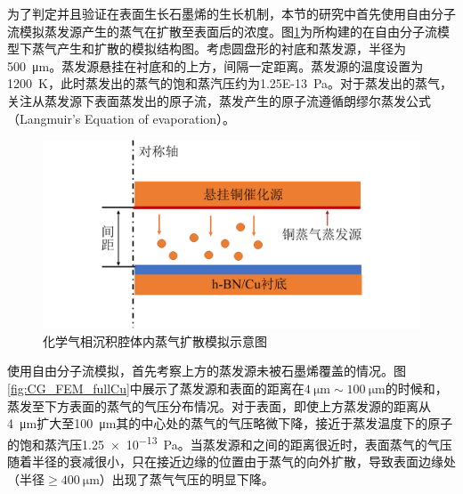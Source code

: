     为了判定并且验证在表面生长石墨烯的生长机制，本节的研究中首先使用自由分子流模拟蒸发源产生的蒸气在扩散至表面后的浓度。图\ref{fig:CG_diagram_FEM_structure}为所构建的在自由分子流模型下蒸气产生和扩散的模拟结构图。考虑圆盘形的衬底和蒸发源，半径为\SI{500}{\micro\meter}。蒸发源悬挂在衬底和的上方，间隔一定距离。蒸发源的温度设置为\SI{1200}{\kelvin}，此时蒸发出的蒸气的饱和蒸汽压约为\SI{1.25E-13}{\pascal}。对于蒸发出的蒸气，关注从蒸发源下表面蒸发出的原子流，蒸发产生的原子流遵循朗缪尔蒸发公式（Langmuir’s Equation of evaporation）。
    
    \begin{figure}[htb]
        \includegraphics{pic/CG_diagram_FEM_structure.png}
        \caption{化学气相沉积腔体内蒸气扩散模拟示意图}
        \label{fig:CG_diagram_FEM_structure}
    \end{figure}

    使用自由分子流模拟，首先考察上方的蒸发源未被石墨烯覆盖的情况。图\ref{fig:CG_FEM_fullCu}中展示了蒸发源和表面的距离在$\SI{4}{\micro\meter} \sim \SI{100}{\micro\meter}$的时候和，蒸发至下方表面的蒸气的气压分布情况。对于表面，即使上方蒸发源的距离从\SI{4}{\micro\meter}扩大至\SI{100}{\micro\meter}其的中心处的蒸气的气压略微下降，接近于蒸发温度下的原子的饱和蒸汽压\SI{1.25e-13}{\pascal}。当蒸发源和之间的距离很近时，表面蒸气的气压随着半径的衰减很小，只在接近边缘的位置由于蒸气的向外扩散，导致表面边缘处（半径$\geqslant \SI{400}{\micro\meter}$）出现了蒸气气压的明显下降。
    
